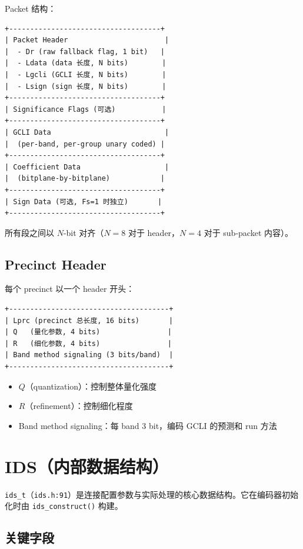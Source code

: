 Packet 结构：
\begin{lstlisting}[numbers=none]
+------------------------------------+
| Packet Header                       |
|  - Dr (raw fallback flag, 1 bit)   |
|  - Ldata (data 长度, N bits)        |
|  - Lgcli (GCLI 长度, N bits)        |
|  - Lsign (sign 长度, N bits)        |
+------------------------------------+
| Significance Flags (可选)           |
+------------------------------------+
| GCLI Data                           |
|  (per-band, per-group unary coded) |
+------------------------------------+
| Coefficient Data                    |
|  (bitplane-by-bitplane)            |
+------------------------------------+
| Sign Data (可选, Fs=1 时独立)       |
+------------------------------------+
\end{lstlisting}

所有段之间以 $N$-bit 对齐（$N = 8$ 对于 header，$N = 4$ 对于 sub-packet 内容）。

\subsection{Precinct Header}

每个 precinct 以一个 header 开头：
\begin{lstlisting}[numbers=none]
+--------------------------------------+
| Lprc (precinct 总长度, 16 bits)       |
| Q   (量化参数, 4 bits)                |
| R   (细化参数, 4 bits)                |
| Band method signaling (3 bits/band)  |
+--------------------------------------+
\end{lstlisting}

\begin{itemize}
  \item $Q$（quantization）：控制整体量化强度
  \item $R$（refinement）：控制细化程度
  \item Band method signaling：每 band 3 bit，编码 GCLI 的预测和 run 方法
\end{itemize}

\section{IDS（内部数据结构）}

\texttt{ids\_t}（\texttt{ids.h:91}）是连接配置参数与实际处理的核心数据结构。它在编码器初始化时由 \texttt{ids\_construct()} 构建。

\subsection{关键字段}

